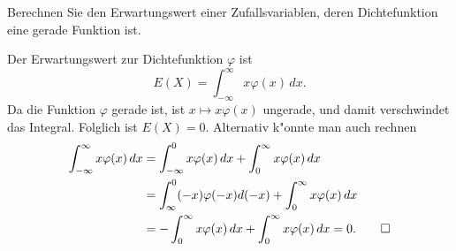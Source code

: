 Berechnen Sie den Erwartungswert einer Zufallsvariablen, deren
Dichtefunktion eine gerade Funktion ist.

\begin{loesung}
Der Erwartungswert zur Dichtefunktion $\varphi$ ist
\[
E(X)=\int_{-\infty}^\infty x\varphi(x)\,dx.
\]
Da die Funktion $\varphi$ gerade ist, ist $x\mapsto x\varphi(x)$
ungerade, und damit verschwindet das Integral. Folglich ist $E(X)=0$.
Alternativ k"onnte man auch rechnen
\begin{align*}
\int_{-\infty}^\infty x\varphi(x)\,dx
&=\int_{-\infty}^0x\varphi(x)\,dx +\int_0^\infty x\varphi(x)\,dx\\
&=\int_{\infty}^0(-x)\varphi(-x)d(-x)+\int_0^\infty x\varphi(x)\,dx\\
&=-\int_0^{\infty}x\varphi(x)\,dx+\int_0^\infty x\varphi(x)\,dx=0.
\qedhere
\end{align*}
\end{loesung}

